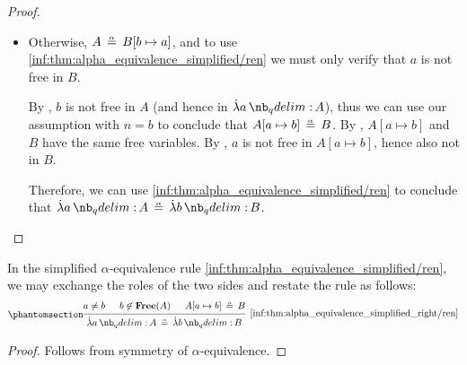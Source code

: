 \begin{proof}
\begin{itemize}
    \item Otherwise, \( A \aequiv B[b \mapsto a] \), and to use \ref{inf:thm:alpha_equivalence_simplified/ren} we must only verify that \( a \) is not free in \( B \).

    By , \( b \) is not free in \( A \) (and hence in \( \qabs a A \)), thus we can use our assumption with \( n = b \) to conclude that \( A[a \mapsto b] \aequiv B \). By , \( A[a \mapsto b] \) and \( B \) have the same free variables. By , \( a \) is not free in \( A[a \mapsto b] \), hence also not in \( B \).

    Therefore, we can use \ref{inf:thm:alpha_equivalence_simplified/ren} to conclude that \( \qabs a A \aequiv \qabs b B \).
  \end{itemize}
\end{proof}

\begin{proposition}\label{thm:alpha_equivalence_simplified_right}
  In the simplified \( \alpha \)-equivalence rule \ref{inf:thm:alpha_equivalence_simplified/ren}, we may exchange the roles of the two sides and restate the rule as follows:
  \begin{equation*}\taglabel[\ensuremath{ \logic{Ren}_\alpha^{\logic{r}} }]{inf:thm:alpha_equivalence_simplified_right/ren}
    \begin{prooftree}
      \hypo{ a \neq b }
      \hypo{ b \not\in \op*{Free}(A) }
      \hypo{ A[a \mapsto b] \aequiv B }
      \infer3[\ref{inf:thm:alpha_equivalence_simplified_right/ren}]{ \qabs a A \aequiv \qabs b B }
    \end{prooftree}
  \end{equation*}
\end{proposition}
\begin{proof}
  Follows from symmetry of \( \alpha \)-equivalence.
\end{proof}

